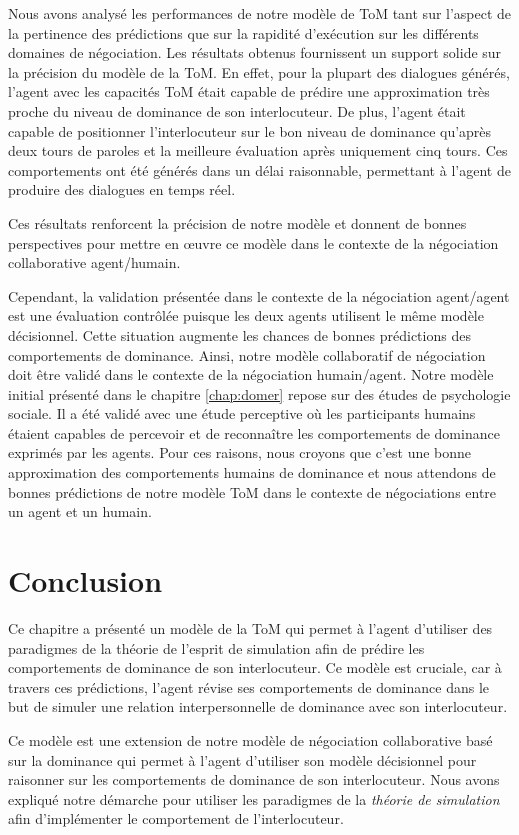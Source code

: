	Nous avons analysé les performances de notre modèle de ToM tant sur l'aspect de la pertinence des prédictions que sur la rapidité d'exécution sur les différents domaines de négociation. Les résultats obtenus fournissent un support solide sur la précision du modèle de la ToM.
	 En effet, pour la plupart des dialogues générés, l'agent avec les capacités ToM était capable de prédire une approximation très proche du niveau de dominance de son interlocuteur. De plus, l'agent était capable de positionner l'interlocuteur sur le bon niveau de dominance qu'après deux tours de paroles et la meilleure évaluation après uniquement cinq tours. Ces comportements ont été générés dans un délai raisonnable, permettant à l'agent de produire des dialogues en temps réel.
	
	Ces résultats renforcent la précision de notre modèle et donnent de bonnes perspectives pour mettre en œuvre ce modèle dans le contexte de la négociation collaborative agent/humain. 
	
	Cependant, la validation présentée dans le contexte de la négociation agent/agent est une évaluation contrôlée puisque les deux agents utilisent le même modèle décisionnel. Cette situation augmente les chances de bonnes prédictions des comportements de dominance.
	Ainsi, notre modèle collaboratif de négociation doit être validé dans le contexte de la négociation humain/agent. Notre modèle initial présenté dans le chapitre \ref{chap:domer} repose sur des études de psychologie sociale. Il a été validé avec une étude perceptive où les participants humains étaient capables de percevoir et de reconnaître les comportements de dominance exprimés par les agents. Pour ces raisons, nous croyons que c'est une bonne approximation des comportements humains de dominance et nous attendons de bonnes prédictions de notre modèle ToM dans le contexte de négociations entre un agent et un humain.


\section{Conclusion}
	Ce chapitre a présenté un modèle de la ToM qui permet à l'agent d'utiliser des paradigmes de la théorie de l'esprit de simulation afin de prédire les comportements de dominance de son interlocuteur. Ce modèle est cruciale, car à travers ces prédictions, l'agent révise ses comportements de dominance dans le but de simuler une relation interpersonnelle de dominance avec son interlocuteur. 
	
	Ce modèle est une extension de notre modèle de négociation collaborative basé sur la dominance qui permet à l'agent d'utiliser son modèle décisionnel pour raisonner sur les comportements de dominance de son interlocuteur. Nous avons expliqué notre démarche pour utiliser les paradigmes de la \emph{théorie de simulation} afin d'implémenter le comportement de l'interlocuteur. 
	

